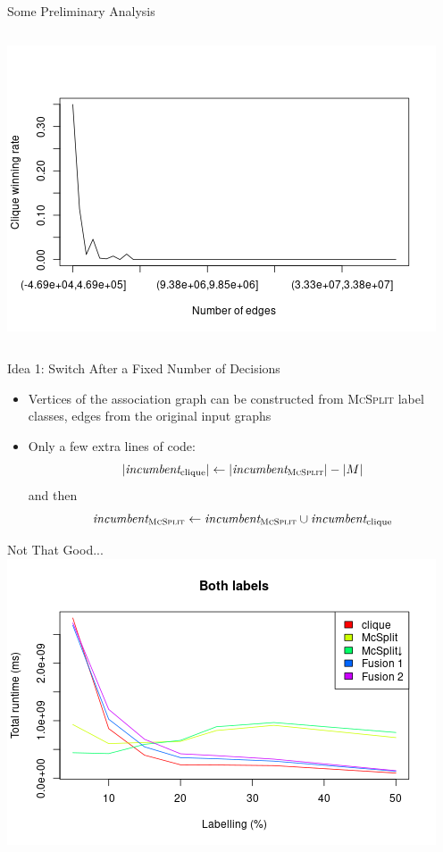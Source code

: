 \documentclass{beamer}
\begin{document}
\begin{frame}{Some Preliminary Analysis}
\begin{columns}
\begin{column}{0.5\textwidth}
      \includegraphics[width=\textwidth,height=0.4\textheight,keepaspectratio]{../dissertation/images/edges_bins.png}
    \end{column}
  \end{columns}
\end{frame}

\begin{frame}{Idea 1: Switch After a Fixed Number of Decisions}
  \pause
  \begin{itemize}
  \item Vertices of the association graph can be constructed from \textsc{McSplit}
    label classes, edges from the original input graphs
  \item Only a few extra lines of code:
    \[ |\textit{incumbent}_{\text{clique}}| \gets
      |\textit{incumbent}_{\text{\textsc{McSplit}}}| - |M| \]
    and then
    \[ \textit{incumbent}_{\textsc{McSplit}} \gets
      \textit{incumbent}_{\textsc{McSplit}} \cup
      \textit{incumbent}_{\text{clique}} \]
  \end{itemize}
\end{frame}

\begin{frame}{Not That Good...}
  \centering
  \includegraphics[scale=0.5]{../dissertation/images/fusion_linechart.png}
\end{frame}
\end{document}
